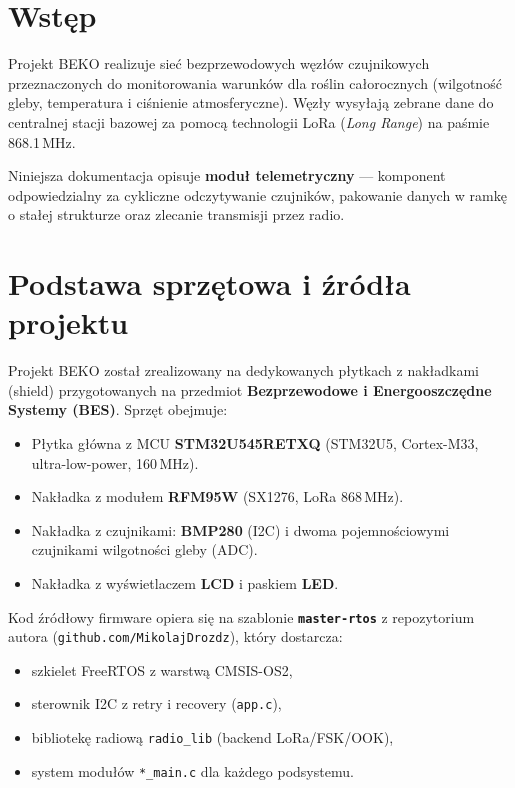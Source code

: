 \documentclass[12pt,a4paper]{article}
\newcommand{\qty}[2]{#1\,\ensuremath{#2}}
\newcommand{\mega}{\mathrm{M}}
\newcommand{\hertz}{\mathrm{Hz}}
\begin{document}
\tableofcontents
\newpage

\section{Wstęp}

Projekt BEKO realizuje sieć bezprzewodowych węzłów czujnikowych przeznaczonych
do monitorowania warunków dla roślin całorocznych (wilgotność gleby, temperatura
i ciśnienie atmosferyczne). Węzły wysyłają zebrane dane do centralnej stacji
bazowej za pomocą technologii LoRa (\textit{Long Range}) na paśmie
\qty{868.1}{\mega\hertz}.

Niniejsza dokumentacja opisuje \textbf{moduł telemetryczny} — komponent
odpowiedzialny za cykliczne odczytywanie czujników, pakowanie danych w ramkę
o stałej strukturze oraz zlecanie transmisji przez radio.

\section{Podstawa sprzętowa i źródła projektu}

Projekt BEKO został zrealizowany na dedykowanych płytkach z nakładkami
(shield) przygotowanych na przedmiot
\textbf{Bezprzewodowe i Energooszczędne Systemy (BES)}.
Sprzęt obejmuje:

\begin{itemize}[noitemsep]
  \item Płytka główna z MCU \textbf{STM32U545RETXQ} (STM32U5, Cortex-M33,
        ultra-low-power, 160\,MHz).
  \item Nakładka z modułem \textbf{RFM95W} (SX1276, LoRa 868\,MHz).
  \item Nakładka z czujnikami: \textbf{BMP280} (I2C) i dwoma
        pojemnościowymi czujnikami wilgotności gleby (ADC).
  \item Nakładka z wyświetlaczem \textbf{LCD} i paskiem \textbf{LED}.
\end{itemize}

Kod źródłowy firmware opiera się na szablonie
\textbf{\texttt{master-rtos}} z repozytorium autora
(\texttt{github.com/MikolajDrozdz}), który dostarcza:
\begin{itemize}[noitemsep]
  \item szkielet FreeRTOS z warstwą CMSIS-OS2,
  \item sterownik I2C z retry i recovery (\texttt{app.c}),
  \item bibliotekę radiową \texttt{radio\_lib} (backend LoRa/FSK/OOK),
  \item system modułów \texttt{*\_main.c} dla każdego podsystemu.
\end{itemize}
\end{document}
